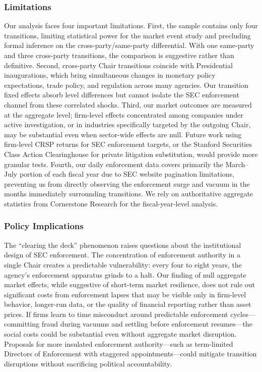 \documentclass[12pt]{article}
\begin{document}
\subsubsection*{Limitations} Our analysis faces four important limitations. First, the sample contains only four transitions, limiting statistical power for the market event study and precluding formal inference on the cross-party/same-party differential. With one same-party and three cross-party transitions, the comparison is suggestive rather than definitive. Second, cross-party Chair transitions coincide with Presidential inaugurations, which bring simultaneous changes in monetary policy expectations, trade policy, and regulation across many agencies. Our transition fixed effects absorb level differences but cannot isolate the SEC enforcement channel from these correlated shocks. Third, our market outcomes are measured at the aggregate level; firm-level effects concentrated among companies under active investigation, or in industries specifically targeted by the outgoing Chair, may be substantial even when sector-wide effects are null. Future work using firm-level CRSP returns for SEC enforcement targets, or the Stanford Securities Class Action Clearinghouse for private litigation substitution, would provide more granular tests. Fourth, our daily enforcement data covers primarily the March--July portion of each fiscal year due to SEC website pagination limitations, preventing us from directly observing the enforcement surge and vacuum in the months immediately surrounding transitions. We rely on authoritative aggregate statistics from Cornerstone Research for the fiscal-year-level analysis.

\subsubsection*{Policy Implications} The ``clearing the deck'' phenomenon raises questions about the institutional design of SEC enforcement. The concentration of enforcement authority in a single Chair creates a predictable vulnerability: every four to eight years, the agency's enforcement apparatus grinds to a halt. Our finding of null aggregate market effects, while suggestive of short-term market resilience, does not rule out significant costs from enforcement lapses that may be visible only in firm-level behavior, longer-run data, or the quality of financial reporting rather than asset prices. If firms learn to time misconduct around predictable enforcement cycles---committing fraud during vacuums and settling before enforcement resumes---the social costs could be substantial even without aggregate market disruption. Proposals for more insulated enforcement authority---such as term-limited Directors of Enforcement with staggered appointments---could mitigate transition disruptions without sacrificing political accountability.
\end{document}

